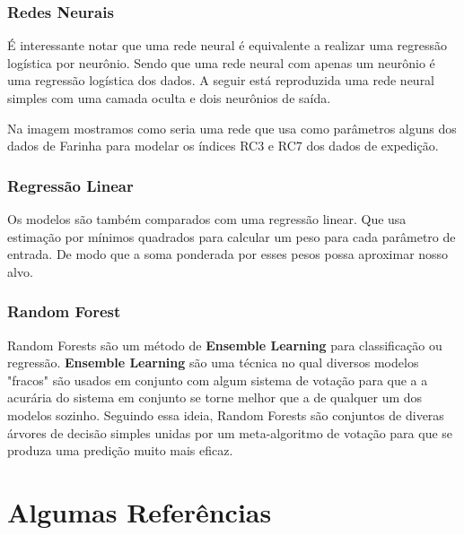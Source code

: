 \subsubsection{Redes Neurais}




É interessante notar que uma rede neural é equivalente a realizar uma regressão logística por neurônio. Sendo que uma rede neural com apenas um neurônio é uma regressão logística dos dados. A seguir está reproduzida uma rede neural simples com uma camada oculta e dois neurônios de saída.




%



Na imagem mostramos como seria uma rede que usa como parâmetros alguns dos dados de Farinha para modelar os índices RC3 e RC7 dos dados de expedição.

\bigskip
\subsubsection{Regressão Linear}
Os modelos são também comparados com uma regressão linear. Que usa estimação por mínimos quadrados para calcular um peso para cada parâmetro de entrada. De modo que a soma ponderada por esses pesos possa aproximar nosso alvo.


\subsubsection{Random Forest}

Random Forests são um método de \textbf{Ensemble Learning} para classificação ou regressão. \textbf{Ensemble Learning} são uma técnica no qual diversos modelos "fracos" são usados em conjunto com algum sistema de votação para que a a acurária do sistema em conjunto se torne melhor que a de qualquer um dos modelos sozinho. Seguindo essa ideia, Random Forests são conjuntos de diveras árvores de decisão simples unidas por um meta-algoritmo de votação para que se produza uma predição muito mais eficaz.



\section{Algumas Referências}
\label{sec:algumas_referencias}

